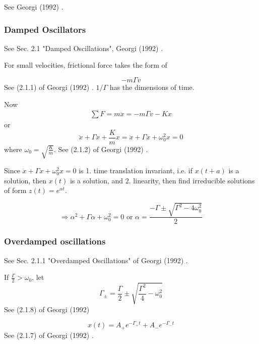 See Georgi (1992) \cite{agat:Geor1992}.

\subsubsection{Damped Oscillators}

See Sec. 2.1 "Damped Oscillations", Georgi (1992) \cite{agat:Geor1992}.

For small velocities, frictional force takes the form of

\begin{equation}
	-m\Gamma v
\end{equation}
See (2.1.1) of Georgi (1992) \cite{agat:Geor1992}. $1/\Gamma$ has the dimensions of time.

Now
\[
\begin{gathered}
	\sum F = m\ddot{x} = -m \Gamma v - Kx
\end{gathered}
\]
or
\begin{equation}
	\ddot{x} + \Gamma \dot{x} + \frac{K}{m} x = \ddot{x} + \Gamma \dot{x} + \omega_0^2 x = 0
\end{equation}
where $\omega_0 = \sqrt{ \frac{K}{m} }$. See (2.1.2) of Georgi (1992) \cite{agat:Geor1992}.

Since $\ddot{x} + \Gamma \dot{x} + \omega_0^2 x = 0$ is 1. time translation invariant, i.e. if $x(t+a)$ is a solution, then $x(t)$ is a solution, and 2. linearity, then find irreducible solutions of form $z(t) = e^{\alpha t}$.

\[
\Longrightarrow \alpha^2 + \Gamma \alpha + \omega_0^2 =0 \text{ or } \alpha = \frac{ -\Gamma \pm \sqrt{ \Gamma^2 - 4\omega_0^2}}{2}
\]

\subsubsection{Overdamped oscillations} See Sec. 2.1.1 "Overdamped Oscillations" of Georgi (1992) \cite{agat:Geor1992}.

If $\frac{\Gamma}{2} > \omega_0$, let
\begin{equation}
	\Gamma_{\pm} = \frac{\Gamma}{2} \pm \sqrt{ \frac{\Gamma^2}{4} - \omega_0^2}
\end{equation}
See (2.1.8) of Georgi (1992) \cite{agat:Geor1992}

\begin{equation}
	x(t) = A_+ e^{-\Gamma_+ t} + A_- e^{-\Gamma_- t}
\end{equation}
See (2.1.7) of Georgi (1992) \cite{agat:Geor1992}.

